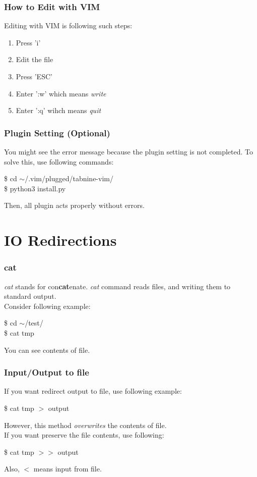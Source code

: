 \documentclass{beamer}
\begin{document}
	\begin{frame}
		\frametitle{How to Edit with VIM}
		Editing with VIM is following such steps:
		\begin{enumerate}
			\item Press 'i'
			\item Edit the file
			\item Press 'ESC'
			\item Enter ':w' which means \textit{write}
			\item Enter ':q' wihch means \textit{quit}
		\end{enumerate}
	\end{frame}

	\begin{frame}
		\frametitle{Plugin Setting (Optional)}
		You might see the error message because the plugin setting is not completed. To solve this, use following commands:
		\begin{example}
			\$ cd $\sim$/.vim/plugged/tabnine-vim/ \\
			\$ python3 install.py 
		\end{example}
		Then, all plugin acts properly without errors. 
	\end{frame}

	\section{IO Redirections}
	
	\begin{frame}
		\frametitle{cat}
		\textit{cat} stands for con\textbf{cat}enate. \textit{cat} command reads files, and writing them to standard output. \\
		Consider following example:
		\begin{example}
			\$ cd $\sim$/test/ \\
			\$ cat tmp 
		\end{example}
		You can see contents of file. 
	\end{frame}

	\begin{frame}
		\frametitle{Input/Output to file}
		If you want redirect output to file, use following example:
		\begin{example}
			\$ cat tmp $>$ output
		\end{example}
		However, this method \textit{overwrites} the contents of file. \\
		If you want preserve the file contents, use following: 
		\begin{example}
			\$ cat tmp $>>$ output
		\end{example}
	
		Also, $<$ means input from file.
	\end{frame}
\end{document}

